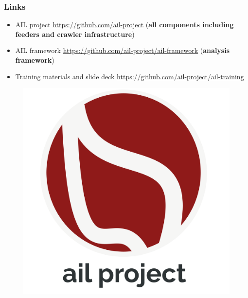 \documentclass{beamer}
\begin{document}
\begin{frame}
\frametitle{Links}
    \begin{itemize}
        \item AIL project \url{https://github.com/ail-project} ({\bf all components including feeders and crawler infrastructure})
        \item AIL framework \url{https://github.com/ail-project/ail-framework} ({\bf analysis framework})
        \item Training materials and slide deck \url{https://github.com/ail-project/ail-training}
    \end{itemize}
    \begin{figure}
        \includegraphics[scale=0.10, angle=0]{images/ail-project.png}
    \end{figure}
\end{frame}
\end{document}

